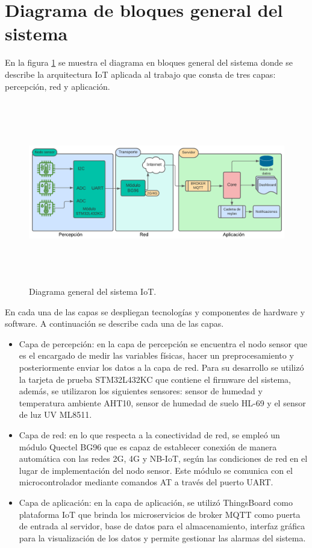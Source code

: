 \section{Diagrama de bloques general del sistema}

En la figura \ref{fig:Diagrama general del sistema IoT} se muestra el diagrama en bloques general del sistema donde se describe la arquitectura IoT aplicada al trabajo que consta de tres capas: percepción, red y aplicación.

\begin{figure}[h]
	\includegraphics[width=\textwidth, height=8cm]{./Figures/DiagramaDelSistema.png}
	\caption{Diagrama general del sistema IoT.}
	\label{fig:Diagrama general del sistema IoT}
\end{figure}

En cada una de las capas se despliegan tecnologías y componentes de hardware y software. A continuación se describe cada una de las capas.

\begin{itemize}
	\item Capa de percepción: en la capa de percepción se encuentra el nodo sensor que es el encargado de medir las variables físicas, hacer un preprocesamiento y posteriormente enviar los datos a la capa de red. Para su desarrollo se utilizó la tarjeta de prueba STM32L432KC que contiene el firmware del sistema, además, se utilizaron los siguientes sensores: sensor de humedad y temperatura ambiente AHT10, sensor de humedad de suelo HL-69 y el sensor de luz UV ML8511.
  \item Capa de red: en lo que respecta a la conectividad de red, se empleó un módulo Quectel BG96 que es capaz de establecer conexión de manera automática con las redes 2G, 4G y NB-IoT, según las condiciones de red en el lugar de implementación del nodo sensor. Este módulo se comunica con el microcontrolador mediante comandos AT a través del puerto UART.
  \item Capa de aplicación: en la capa de aplicación, se utilizó ThingsBoard como plataforma IoT que brinda los microservicios de broker MQTT como puerta de entrada al servidor, base de datos para el almacenamiento, interfaz gráfica para la visualización de los datos y permite gestionar las alarmas del sistema.
\end{itemize}

